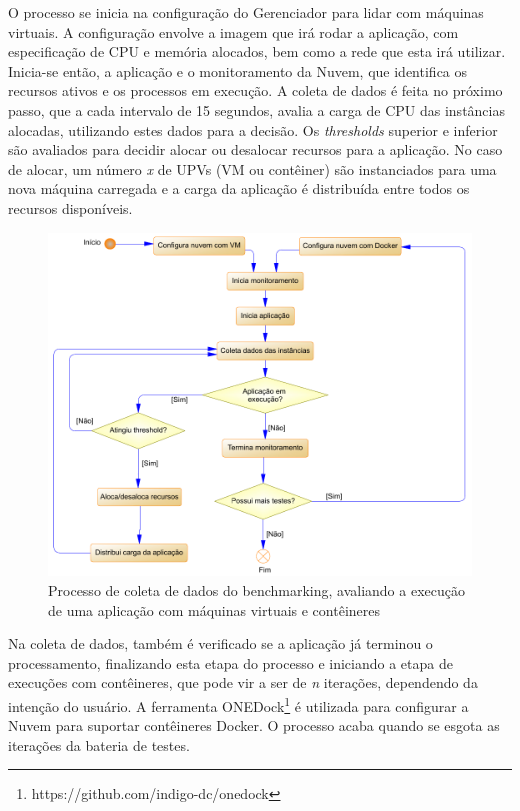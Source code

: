 \documentclass[twoside,english,brazilian]{UNISINOSartigo}
\begin{document}
O processo se inicia na configuração do Gerenciador para lidar com máquinas virtuais. A configuração envolve a imagem que irá rodar a aplicação, com especificação de CPU e memória alocados, bem como a rede que esta irá utilizar. Inicia-se então, a aplicação e o monitoramento da Nuvem, que identifica os recursos ativos e os processos em execução. A coleta de dados é feita no próximo passo, que a cada intervalo de 15 segundos, avalia a carga de CPU das instâncias alocadas, utilizando estes dados para a decisão. Os \textit{thresholds} superior e inferior são avaliados para decidir alocar ou desalocar recursos para a aplicação. No caso de alocar, um número \textit{x} de UPVs (VM ou contêiner) são instanciados para uma nova máquina carregada e a carga da aplicação é distribuída entre todos os recursos disponíveis.

\begin{figure}[ht!]
	\caption{Processo de coleta de dados do benchmarking, avaliando a execução de uma aplicação com máquinas virtuais e contêineres}
	\label{fig:flow}
	\centering%
	\begin{minipage}{0.9\textwidth}
		\includegraphics[width=\textwidth]{images/flow_modelo}
	\end{minipage}
\end{figure}

Na coleta de dados, também é verificado se a aplicação já terminou o processamento, finalizando esta etapa do processo e iniciando a etapa de execuções com contêineres, que pode vir a ser de \textit{n} iterações, dependendo da intenção do usuário. A ferramenta ONEDock\footnote{https://github.com/indigo-dc/onedock} é utilizada para configurar a Nuvem para suportar contêineres Docker. O processo acaba quando se esgota as iterações da bateria de testes.
\end{document}
